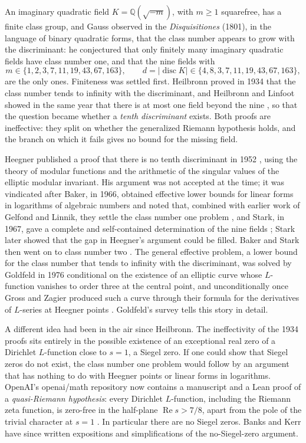 \documentclass[11pt]{article}
\theoremstyle{definition}
\newcommand{\re}{\operatorname{Re}}
\newcommand{\Q}{\mathbb{Q}}
\newcommand{\disc}{\operatorname{disc}}
\begin{document}
An imaginary quadratic field $K = \Q(\sqrt{-m})$, with $m \ge 1$ squarefree, has a finite class group, and Gauss observed in the \emph{Disquisitiones} (1801), in the language of binary quadratic forms, that the class number appears to grow with the discriminant: he conjectured that only finitely many imaginary quadratic fields have class number one, and that the nine fields with
\[
m \in \{1, 2, 3, 7, 11, 19, 43, 67, 163\}, \qquad d = |\disc K| \in \{4, 8, 3, 7, 11, 19, 43, 67, 163\},
\]
are the only ones. Finiteness was settled first. Heilbronn proved in 1934 that the class number tends to infinity with the discriminant, and Heilbronn and Linfoot showed in the same year that there is at most one field beyond the nine \cite{Heilbronn1934,HeilbronnLinfoot1934}, so that the question became whether a \emph{tenth discriminant} exists. Both proofs are ineffective: they split on whether the generalized Riemann hypothesis holds, and the branch on which it fails gives no bound for the missing field.

Heegner published a proof that there is no tenth discriminant in 1952 \cite{Heegner1952}, using the theory of modular functions and the arithmetic of the singular values of the elliptic modular invariant. His argument was not accepted at the time; it was vindicated after Baker, in 1966, obtained effective lower bounds for linear forms in logarithms of algebraic numbers and noted that, combined with earlier work of Gelfond and Linnik, they settle the class number one problem \cite{Baker1966}, and Stark, in 1967, gave a complete and self-contained determination of the nine fields \cite{Stark1967}; Stark later showed that the gap in Heegner's argument could be filled. Baker and Stark then went on to class number two \cite{Baker1971}. The general effective problem, a lower bound for the class number that tends to infinity with the discriminant, was solved by Goldfeld in 1976 conditional on the existence of an elliptic curve whose $L$-function vanishes to order three at the central point, and unconditionally once Gross and Zagier produced such a curve through their formula for the derivatives of $L$-series at Heegner points \cite{Goldfeld1985,GrossZagier1986}. Goldfeld's survey \cite{Goldfeld1985} tells this story in detail.

A different idea had been in the air since Heilbronn. The ineffectivity of the 1934 proofs sits entirely in the possible existence of an exceptional real zero of a Dirichlet $L$-function close to $s = 1$, a Siegel zero. If one could show that Siegel zeros do not exist, the class number one problem would follow by an argument that has nothing to do with Heegner points or linear forms in logarithms. OpenAI's openai/math repository \cite{OAImath} now contains a manuscript and a Lean proof of a \emph{quasi-Riemann hypothesis}: every Dirichlet $L$-function, including the Riemann zeta function, is zero-free in the half-plane $\re s > 7/8$, apart from the pole of the trivial character at $s = 1$ \cite{OAIqrh}. In particular there are no Siegel zeros. Banks \cite{Banks2026} and Kerr \cite{Kerr2026} have since written expositions and simplifications of the no-Siegel-zero argument.
\end{document}
